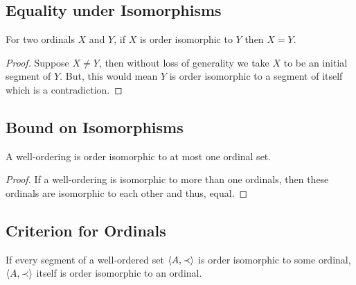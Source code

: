 \subsection{Equality under Isomorphisms}

For two ordinals $X$ and $Y$, if $X$ is order isomorphic to
$Y$ then $X = Y$.

\begin{proof}
    Suppose $X \neq Y$, then without loss of generality we take
    $X$ to be an initial segment of $Y$. But, this would
    mean $Y$ is order isomorphic to a segment of itself
    which is a contradiction.
\end{proof}

\subsection{Bound on Isomorphisms}

A well-ordering is order isomorphic to at most one
ordinal set.

\begin{proof}
    If a well-ordering is isomorphic to more than one
    ordinals, then these ordinals are isomorphic to each other
    and thus, equal.
\end{proof}

\subsection{Criterion for Ordinals}

If every segment of a well-ordered set $\langle A, \prec \rangle$ is 
order isomorphic to some ordinal, $\langle A, \prec \rangle$ itself
is order isomorphic to an ordinal.

